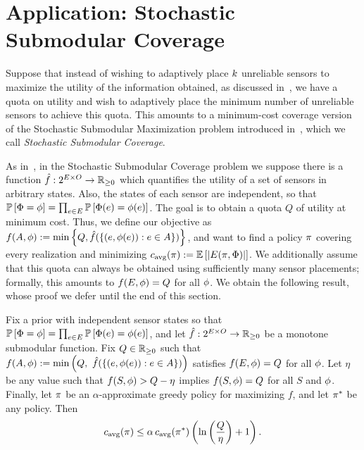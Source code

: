 
%
\section{Application:  Stochastic Submodular Coverage}
\label{sec:stochastic-set-cover} 
%

Suppose that instead of wishing to adaptively place $k$ unreliable sensors
to maximize
the utility of the information obtained, as discussed
in~, 
we have a quota on utility and wish to adaptively place the minimum number of
unreliable sensors to achieve this quota. This amounts to  
a minimum-cost coverage version of the
Stochastic Submodular Maximization problem introduced
in~, which we call 
\emph{Stochastic Submodular Coverage}.

As in~, in the Stochastic Submodular Coverage  problem we suppose there is a function 
$\hat{f}:2^{E\times O}\to \mathbb{R}_{\ge 0}$ which quantifies
the utility of a set of sensors in arbitrary states.
Also, the states of each sensor are independent, so that 
$\mathbb{P}\left[{\color{black}{\ensuremath{\Phi}}} = {\color{black}{\ensuremath{\phi}}}\right]  = \prod_{e \in E} \mathbb{P}\left[{\color{black}{\ensuremath{\Phi}}}(e) =  {\color{black}{\ensuremath{\phi}}}(e)\right] $.
The goal is to obtain a quota $Q$ of utility at minimum cost.
Thus, we define our objective as
$f(A,{\color{black}{\ensuremath{\phi}}}) := \min\left\{Q,\hat{f}(\left\{(e,{\color{black}{\ensuremath{\phi}}}(e)) : e \in A\right\})\right\}$, and want to 
find a policy $\pi$ covering every realization 
and minimizing
${c_{\text{avg}}{(\pi)}} := \mathbb{E}\left[|E({\pi}, {{\color{black}{\ensuremath{\Phi}}}})|\right]$.
We additionally assume that this quota can always be obtained using
sufficiently many sensor placements; formally, this amounts to $f(E, {\color{black}{\ensuremath{\phi}}}) = Q$ for all ${\color{black}{\ensuremath{\phi}}}$.
We obtain the following result, whose proof we defer until the end of this section.

\begin{theorem} \label{thm:stochastic-submodular-cover}
Fix a prior with independent sensor states so that $\mathbb{P}\left[{\color{black}{\ensuremath{\Phi}}} = {\color{black}{\ensuremath{\phi}}}\right]  = \prod_{e \in E} \mathbb{P}\left[{\color{black}{\ensuremath{\Phi}}}(e) =  {\color{black}{\ensuremath{\phi}}}(e)\right] $,
and let %
$\hat{f}:2^{E\times O} \to \mathbb{R}_{\ge 0}$
be a monotone submodular function.
Fix $Q \in \mathbb{R}_{\ge 0}$ such that 
$f(A, \rlz) := \min \paren{Q,\ \hat{f}(\set{(\elem,\rlz(\elem)) : \elem \in A})}$
satisfies  $f(E, {\color{black}{\ensuremath{\phi}}}) = Q$ for all ${\color{black}{\ensuremath{\phi}}}$.
Let $\eta$ be any value such that 
$f(S, {\color{black}{\ensuremath{\phi}}}) > Q - \eta$ implies $f(S, {\color{black}{\ensuremath{\phi}}}) = Q$ for all $S$ and ${\color{black}{\ensuremath{\phi}}}$.
Finally, let $\pi$ be an $\alpha$-approximate greedy policy for maximizing
$f$, and let $\pi^*$ be any policy.  Then 
\[
{c_{\text{avg}}{(\pi)}} \le  \alpha\,
{c_{\text{avg}}{(\pi^*)}} \left( {\ln  \left( {\frac{Q}{\eta}} \right)  + 1} \right)  \mbox{.}
\]
\end{theorem}

